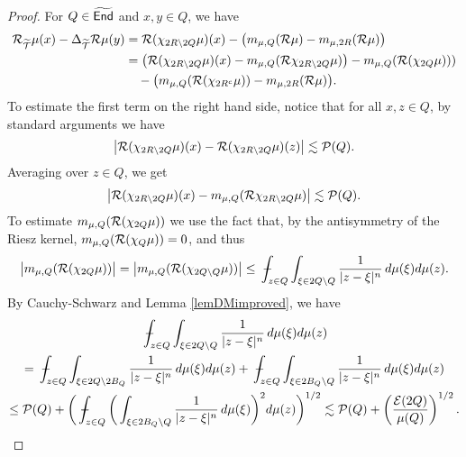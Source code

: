 \begin{proof}
For $Q\in{\widetilde{{\mathsf{End}}}}$ and $x,y\in Q$, we have
\begin{align}\label{eqal842}
{\mathcal R}_{{\widetilde{{\mathcal T}}}}\mu(x) - \Delta_{{\widetilde{{\mathcal T}}}}{\mathcal R}\mu(y) & = {\mathcal R}(\chi_{2R\setminus 2Q}\mu)(x) - 
\big(m_{\mu,Q}({\mathcal R}\mu) - m_{\mu,2R}({\mathcal R}\mu)\big)\\
& = \big({\mathcal R}(\chi_{2R\setminus 2Q}\mu)(x) - m_{\mu,Q}({\mathcal R}\chi_{2R\setminus 2Q}\mu) \big) - m_{\mu,Q}({\mathcal R}(\chi_{2Q}\mu)))\nonumber\\
&\quad -
\big(m_{\mu,Q}({\mathcal R}(\chi_{2R^c}\mu))- m_{\mu,2R}({\mathcal R}\mu)\big).\nonumber
\end{align}
To estimate the first term on the right hand side, notice that for all $x,z\in Q$, by standard arguments we have
$$\big|{\mathcal R}(\chi_{2R\setminus 2Q}\mu)(x) - {\mathcal R}(\chi_{2R\setminus 2Q}\mu)(z)\big|\lesssim {\mathcal P}(Q).$$
Averaging over $z\in Q$, we get
$$\big|{\mathcal R}(\chi_{2R\setminus 2Q}\mu)(x) - m_{\mu,Q}({\mathcal R}\chi_{2R\setminus 2Q}\mu) \big|
\lesssim {\mathcal P}(Q).$$
To estimate $m_{\mu,Q}({\mathcal R}(\chi_{2Q}\mu))$ we use the fact that, by the antisymmetry of the Riesz kernel, $m_{\mu,Q}({\mathcal R}(\chi_{Q}\mu))=0$, and thus
$$\big|m_{\mu,Q}(\RR(\chi_{2Q}\mu))\big| = \big|m_{\mu,Q}(\RR(\chi_{2Q\setminus Q}\mu))\big| 
\leq \avint_{z\in Q}\int_{\xi\in 2Q\setminus Q}\frac1{|z-\xi|^n}\,d\mu(\xi)d\mu(z).$$
By Cauchy-Schwarz and Lemma \ref{lemDMimproved}, we have
\begin{multline}\label{eqboundar3}
\avint_{z\in Q}\int_{\xi\in 2Q\setminus Q}\frac1{|z-\xi|^n}\,d\mu(\xi)d\mu(z)\\
= \avint_{z\in Q}\int_{\xi\in 2Q\setminus 2B_Q}\frac1{|z-\xi|^n}\,d\mu(\xi)d\mu(z) + \avint_{z\in Q}\int_{\xi\in 2B_Q\setminus Q}\frac1{|z-\xi|^n}\,d\mu(\xi)d\mu(z)\\
\leq
  \PP(Q)+\bigg(\avint_{z\in Q}\bigg(\int_{\xi\in 2B_Q\setminus Q}\frac1{|z-\xi|^n}\,d\mu(\xi)\bigg)^2d\mu(z)\bigg)^{1/2}
   \lesssim \PP(Q) + \left(\frac{\EE(2Q)}{\mu(Q)}\right)^{1/2}.
\end{multline}


\end{proof}
